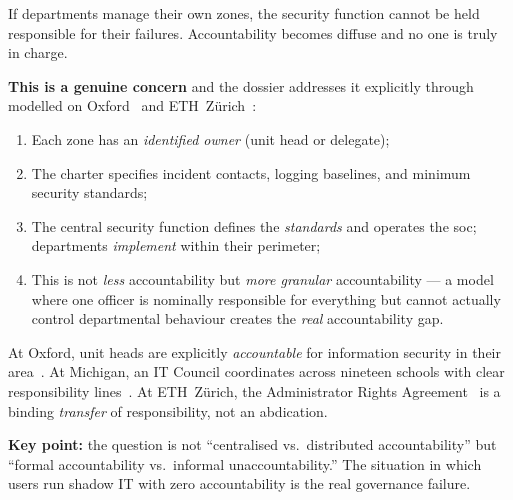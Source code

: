 \begin{questionbox}
If departments manage their own zones, the security function cannot be held responsible for their failures. Accountability becomes diffuse and no one is truly in charge.
\end{questionbox}

\begin{answerbox}[Answer to Q2.1]
\textbf{This is a genuine concern} and the dossier addresses it explicitly through  modelled on Oxford~\cite{oxford-infosec} and ETH~Z\"urich~\cite{eth-baseline}:

\begin{enumerate}[nosep]
    \item Each zone has an \emph{identified owner} (unit head or delegate);
    \item The charter specifies incident contacts, logging baselines, and minimum security standards;
    \item The central security function defines the \emph{standards} and operates the \gls{soc}; departments \emph{implement} within their perimeter;
    \item This is not \emph{less} accountability but \emph{more granular} accountability --- a model where one officer is nominally responsible for everything but cannot actually control departmental behaviour creates the \emph{real} accountability gap.
\end{enumerate}

\noindent At Oxford, unit heads are explicitly \emph{accountable} for information security in their area~\cite{oxford-infosec}. At Michigan, an IT Council coordinates across nineteen schools with clear responsibility lines~\cite{umich-it-council}. At ETH~Z\"urich, the Administrator Rights Agreement~\cite{eth-admin-agreement} is a binding \emph{transfer} of responsibility, not an abdication.

\medskip\noindent\textbf{Key point:} the question is not ``centralised vs.\ distributed accountability'' but ``formal accountability vs.\ informal unaccountability.'' The situation in which users run shadow IT with zero accountability is the real governance failure.


\end{answerbox}
